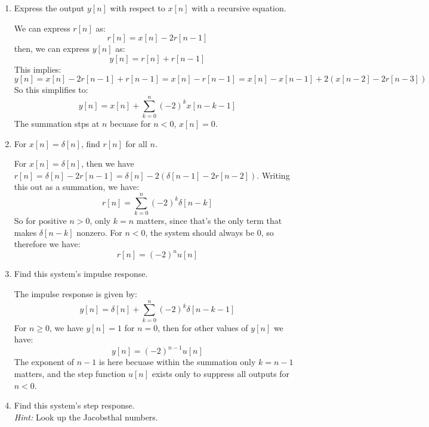 \documentclass[10pt]{article}
\begin{document}
	\begin{enumerate}[label=\alph*)]
		\item Express the output \( y[n] \) with respect to \( x[n]  \) with a recursive equation. 

			\begin{solution}
				We can express \( r[n] \) as:
				\[
					r[n] = x[n] - 2r[n - 1]
				\] 
				then, we can express \( y[n] \) as:
				\[
					y[n] = r[n] + r[n - 1]
				\] 
				This implies:
				\[
					y[n] = x[n] - 2r[n - 1] + r[n - 1] = x[n] - r[n - 1] = x[n] - x[n - 1] + 2(x[n - 2] - 2r[n -3])
				\] 
				So this simplifies to:
				\[
					y[n] = x[n] + \sum_{k = 0}^{n}(-2)^{k}x[n - k - 1]
				\] 
				The summation stps at \( n \) becuase for \( n < 0 \), \( x[n] = 0 \). 
			\end{solution}
		\item For \( x[n] = \delta[n] \), find \( r[n] \) for all \( n \). 

			\begin{solution}
				For \( x[n] = \delta[n] \), then we have  \( r[n] = \delta[n] - 2r[n-1] = \delta[n] - 2(\delta[n-1]
				- 2r[n - 2])\). Writing this out as a summation, we have:
				\[
					r[n] = \sum_{k = 0}^{n} (-2)^{k}\delta[n - k]
				\] 
				So for positive \( n > 0 \), only \( k = n \) matters, since that's the only term that makes 
				\( \delta[n - k] \) nonzero. 
				For \( n < 0 \), the system should always be 0, so therefore we have: 
				\[
					r[n] = (-2)^{n}u[n]
				\] 
			\end{solution}
		\item Find this system's impulse response. 

			\begin{solution}
				The impulse response is given by:
				\[
					y[n] = \delta[n] + \sum_{k = 0}^{n}(-2)^{k}\delta[n - k - 1] 
				\] 
				For \( n \ge 0 \), we have \( y[n] = 1 \) for \( n = 0 \), then for other values of \( y[n] \) we
				have:
				\[
					y[n] = (-2)^{n - 1}u[n]
				\] 
				The exponent of \( n - 1 \) is here becuase within the summation only \( k = n - 1 \) matters, 
				and the step function \( u[n] \) exists only to suppress all outputs for \( n < 0 \). 
			\end{solution}
		\item Find this system's step response. \\
			\textit{Hint:} Look up the Jacobsthal numbers.


\end{enumerate}
\end{document}
